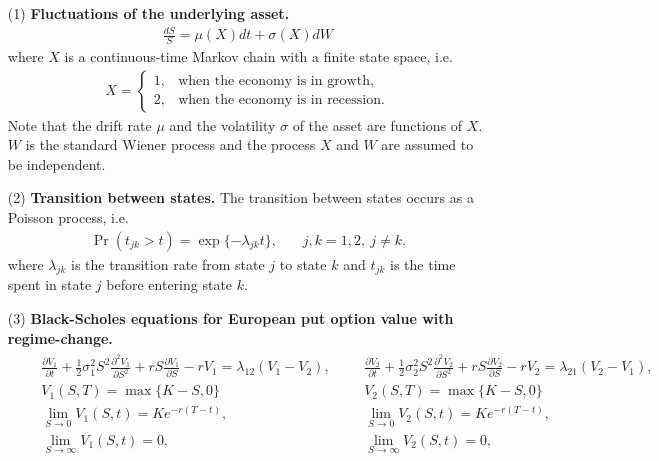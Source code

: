 \documentclass[11pt,letter]{article}
\def\l{\lambda} \def\m{\mu} \def\s{\sigma} \def\t{\tau} \def\w{\omega}
\theoremstyle{definition}
\theoremstyle{remark}
\numberwithin{equation}{section}
\begin{document}
\begin{itemize}
    \item[(1)] \textbf{Fluctuations of the underlying asset.}
    \begin{align*}
        \frac{dS}{S}=\m(X)dt+\s(X)dW
    \end{align*}
    where $X$ is a continuous-time Markov chain with a finite state space, i.e.
    \begin{align*}
        X=
        \begin{cases}
        1,              & \text{when the economy is in growth,} \\
        2,              & \text{when the economy is in recession.}
        \end{cases}
    \end{align*}
    Note that the drift rate $\m$ and the volatility $\s$ of the asset are functions of $X$. $W$ is the standard Wiener process and the process $X$ and $W$ are assumed to be independent.
    
    \item[(2)] \textbf{Transition between states.} The transition between states occurs as a Poisson process, i.e.
    \begin{align*}
        \Pr(t_{jk}>t)=\exp\{-\l_{jk}t\},~~~~~~~~j,k=1,2,~j\ne k.
    \end{align*}
    where $\l_{jk}$ is the transition rate from state $j$ to state $k$ and $t_{jk}$ is the time spent in state $j$ before entering state $k$.
    
    \item[(3)] \textbf{Black-Scholes equations for European put option value with regime-change.}
    \begin{align*}
        &\begin{aligned}
        &\frac{\partial V_1}{\partial t}+\frac{1}{2}\s_1^2S^2\frac{\partial^2V_1}{\partial S^2}+rS\frac{\partial V_1}{\partial S}-rV_1=\l_{12}(V_1-V_2),\\
        &V_1(S,T)=\max\{K-S,0\}\\
        &\lim_{S\rightarrow0}V_1(S,t)=Ke^{-r(T-t)},\\
        &\lim_{S\rightarrow\infty}V_1(S,t)=0,\\
        \end{aligned}
        &\begin{aligned}
        &\frac{\partial V_2}{\partial t}+\frac{1}{2}\s_2^2S^2\frac{\partial^2V_2}{\partial S^2}+rS\frac{\partial V_2}{\partial S}-rV_2=\l_{21}(V_2-V_1),\\
        &V_2(S,T)=\max\{K-S,0\}\\
        &\lim_{S\rightarrow0}V_2(S,t)=Ke^{-r(T-t)},\\
        &\lim_{S\rightarrow\infty}V_2(S,t)=0,\\
        \end{aligned}
    \end{align*}
    

\end{itemize}
\end{document}
